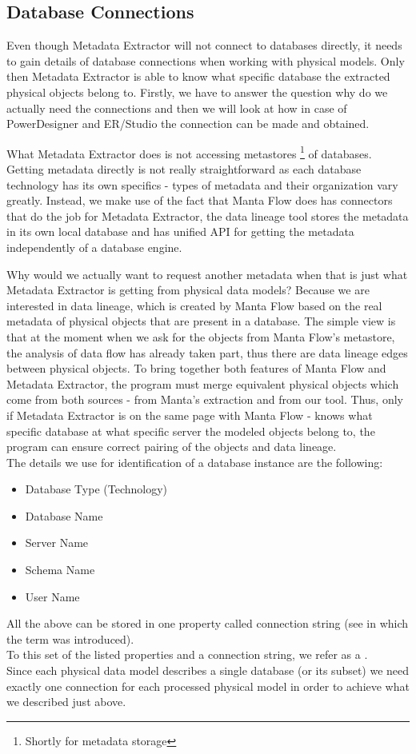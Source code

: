 \subsection{Database Connections}

Even though Metadata Extractor will not connect to databases directly, it needs to gain details of database connections when working with physical models.
Only then Metadata Extractor is able to know what specific database the extracted physical objects belong to. Firstly, we have to answer the question why do we actually need the connections and then we will look at how in case of PowerDesigner and ER/Studio the connection can be made and obtained.

What Metadata Extractor does is not accessing metastores \footnote{Shortly for metadata storage} of databases. Getting metadata directly is not really straightforward as each database technology has its own specifics - types of metadata and their organization vary greatly. 
Instead, we make use of the fact that Manta Flow does has connectors that do the job for Metadata Extractor, the data lineage tool stores the metadata in its own local database and has unified API for getting the metadata independently of a database engine. 

Why would we actually want to request another metadata when that is just what Metadata Extractor is getting from physical data models? \label{matching_physical_objects}
Because we are interested in data lineage, which is created by Manta Flow based on the real metadata of physical objects that are present in a database.
The simple view is that at the moment when we ask for the objects from Manta Flow's metastore, the analysis of data flow has already taken part, thus there are data lineage edges between physical objects. To bring together both features of Manta Flow and Metadata Extractor, the program must merge equivalent physical objects which come from both sources - from Manta's extraction and from our tool.
Thus, only if Metadata Extractor is on the same page with Manta Flow - knows what specific database at what specific server the modeled objects belong to, the program can ensure correct pairing of the objects and data lineage. \\

The details we use for identification of a database instance are the following:
\begin{itemize}
	\item Database Type (Technology)
	\item Database Name
	\item Server Name
	\item Schema Name
	\item User Name
\end{itemize} 
All the above can be stored in one property called connection string (see  in which the term was introduced).\\
To this set of the listed properties and a connection string, we refer as a . \\
Since each physical data model describes a single database (or its subset) we need exactly one connection for each processed physical model in order to achieve what we described just above.

